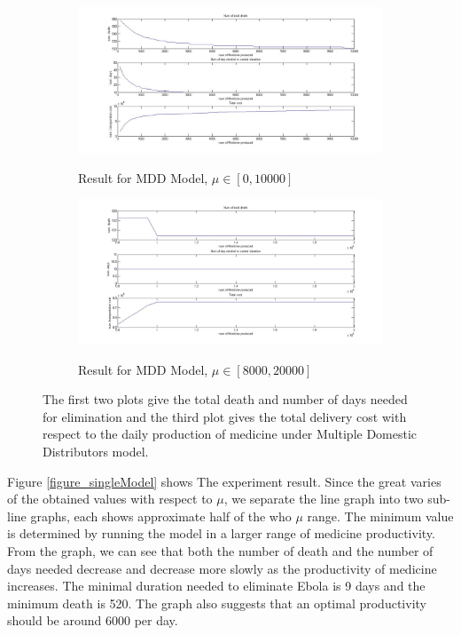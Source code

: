 \documentclass[12pt,a4paper,titlepage]{article}
\begin{document}
\begin{figure}[htbp]
  	\centering
  	\begin{subfigure}[b]{1\textwidth}
      	\includegraphics[width=\textwidth]{figures/imgMultiShort.jpg}
      	\label{figure_multiModel_short}
      	\caption{Result for MDD Model, $\mu \in [0, 10000]$}
  	\end{subfigure}
  	\begin{subfigure}[b]{1\textwidth}
      	\includegraphics[width=\textwidth]{figures/imgMultiLong.jpg}
   		 \label{figure_multiModel_long}
   		 \caption{Result for MDD Model, $\mu \in [8000, 20000]$}
  	\end{subfigure}
  	\caption{\label{MultiDomDis}The first two plots give the total death and number of days needed for elimination and the third plot gives the total delivery cost with respect to the daily production of medicine under Multiple Domestic Distributors model.}
  	\label{figure_multiModel}
\end{figure}


Figure \ref{figure_singleModel} shows The experiment result. Since the great varies of the obtained values with respect to $\mu$, we separate the line graph into two sub-line graphs, each shows approximate half of the who $\mu$ range. The minimum value is determined by running the model in a larger range of medicine productivity. From the graph, we can see that both the number of death and the number of days needed decrease and decrease more slowly as the productivity of medicine increases. The minimal duration needed to eliminate Ebola is 9 days and the minimum death is 520. The graph also suggests that an optimal productivity should be around 6000 per day.
\end{document}
